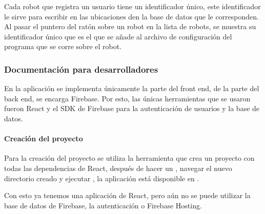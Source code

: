 Cada robot que registra un usuario tiene un identificador único, este identificador
le sirve para escribir en las ubicaciones den la base de datos que le corresponden.
Al pasar el puntero del ratón sobre un robot en la lista de robots, se muestra
su identificador único que es el que se añade al archivo de configuración
del programa que se corre sobre el robot.


\subsubsection{Documentación para desarrolladores}
\label{\detokenize{code_docs:documentacion-para-desarrolladores}}\label{\detokenize{code_docs::doc}}
En la aplicación se implementa únicamente la parte del front end, de la parte
del back end, se encarga Firebase. Por esto, las únicas herramientas que se
usaron fueron React y el SDK de Firebase para la autenticación de usuarios y la base
de datos.


\paragraph{Creación del proyecto}
\label{\detokenize{code_docs:creacion-del-proyecto}}
Para la creación del proyecto se utiliza la herramienta 
que crea un proyecto con todas las dependencias de React, después de hacer un
, navegar el nuevo directorio creado y
ejecutar , la aplicación está disponible en .

Con esto ya tenemos una aplicación de React, pero aún no se puede
utilizar la base de datos de Firebase, la autenticación o Firebase Hosting.

